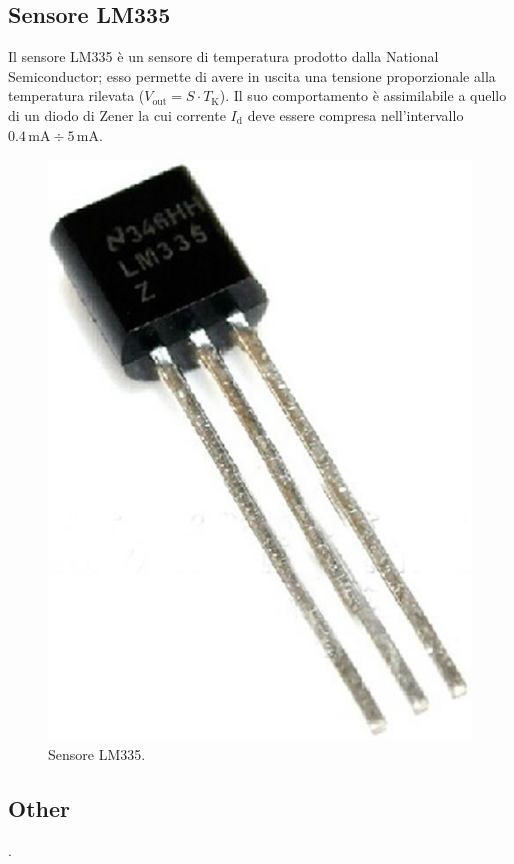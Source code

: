 \documentclass[a4paper]{article}
\begin{document}
		\subsection{Sensore LM335}
			Il sensore LM335 è un sensore di temperatura prodotto dalla National Semiconductor; esso permette di avere in uscita una tensione proporzionale alla temperatura rilevata ($ V_{\mathrm{out}} = S \cdot T_{\mathrm{K}} $).
			\newline
			Il suo comportamento è assimilabile a quello di un diodo di Zener la cui corrente $ I_{\mathrm{d}} $ deve essere compresa nell'intervallo $ 0.4 \, \mathrm{mA} \div 5 \, \mathrm{mA} $.
			\begin{figure}[h!]
				\centering
				\includegraphics[scale=0.2]{LM335}
				\caption{Sensore LM335.}
				\label{fig:LM335}
			\end{figure}
		\subsection{Other}
			.
\end{document}
